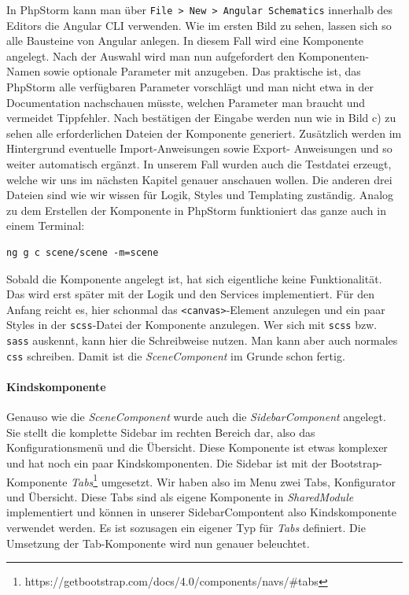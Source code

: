 %
In PhpStorm kann man über \lstinline{File > New > Angular Schematics} innerhalb des Editors die Angular CLI verwenden. Wie im ersten Bild zu sehen, lassen sich so alle Bausteine von Angular anlegen. In diesem Fall wird eine Komponente angelegt. Nach der Auswahl wird man nun aufgefordert den Komponenten-Namen sowie optionale Parameter mit anzugeben. Das praktische ist, das PhpStorm alle verfügbaren Parameter vorschlägt und man nicht etwa in der Documentation nachschauen müsste, welchen Parameter man braucht und vermeidet Tippfehler. Nach bestätigen der Eingabe werden nun wie in Bild c) zu sehen alle erforderlichen Dateien der Komponente generiert. Zusätzlich werden im Hintergrund eventuelle Import-Anweisungen sowie Export- Anweisungen und so weiter automatisch ergänzt. In unserem Fall wurden auch die Testdatei erzeugt, welche wir uns im nächsten Kapitel genauer anschauen wollen. Die anderen drei Dateien sind wie wir wissen für Logik, Styles und Templating zuständig. Analog zu dem Erstellen der Komponente in PhpStorm funktioniert das ganze auch in einem Terminal:
%
\begin{lstlisting}[caption={Generieren einer Szene mit Angular CLI},label=lst:genscene]
ng g c scene/scene -m=scene
\end{lstlisting}
%
Sobald die Komponente angelegt ist, hat sich eigentliche keine Funktionalität. Das wird erst später mit der Logik und den Services implementiert. Für den Anfang reicht es, hier schonmal das \texttt{<canvas>}-Element anzulegen und ein paar Styles in der \texttt{scss}-Datei der Komponente anzulegen. Wer sich mit \texttt{scss} bzw. \texttt{sass} auskennt, kann hier die Schreibweise nutzen. Man kann aber auch normales \texttt{css} schreiben. Damit ist die \textit{SceneComponent} im Grunde schon fertig.
\paragraph{Kindskomponente}
Genauso wie die \textit{SceneComponent} wurde auch die \textit{SidebarComponent} angelegt. Sie stellt die komplette Sidebar im rechten Bereich dar, also das Konfigurationsmenü und die Übersicht. Diese Komponente ist etwas komplexer und hat noch ein paar Kindskomponenten. Die Sidebar ist mit der Bootstrap-Komponente \textit{Tabs}\footnote{https://getbootstrap.com/docs/4.0/components/navs/\#tabs} umgesetzt. Wir haben also im Menu zwei Tabs, Konfigurator und Übersicht. Diese Tabs sind als eigene Komponente in \textit{SharedModule} implementiert und können in unserer SidebarCompontent also Kindskomponente verwendet werden. Es ist sozusagen ein eigener Typ für \textit{Tabs} definiert. Die Umsetzung der Tab-Komponente wird nun genauer beleuchtet.\\

